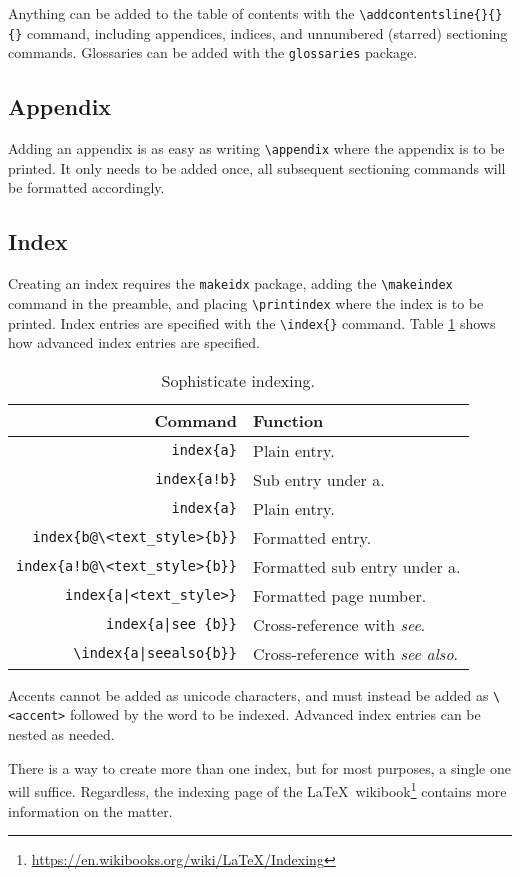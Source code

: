 Anything can be added to the table of contents with the
\verb|\addcontentsline{}{}{}| command, including appendices, indices,
and unnumbered (starred) sectioning commands.  Glossaries can be added
with the \verb|glossaries| package.
%
\subsection{Appendix}
%
Adding an appendix is as easy as writing \verb|\appendix| where the
appendix is to be printed.  It only needs to be added once, all
subsequent sectioning commands will be formatted accordingly.
%
\subsection{Index}
%
Creating an index requires the \verb|makeidx| package, adding the
\verb|\makeindex| command in the preamble, and placing
\verb|\printindex| where the index is to be printed.  Index entries
are specified with the \verb|\index{}| command.  Table \ref{t:index}
shows how advanced index entries are specified.
\begin{table}[!htbp]
  \centering
  \caption{Sophisticate indexing.}
  \label{t:index}
  \begin{tabular}{rl}
    \toprule
    Command & Function \\
    \midrule
    \verb|index{a}| & Plain entry. \\
    \verb|index{a!b}| & Sub entry under a. \\
    \verb|index{a}| & Plain entry. \\
    \verb|index{b@\<text_style>{b}}| & Formatted entry. \\
    \verb|index{a!b@\<text_style>{b}}| & Formatted sub entry under a. \\
    \verb+index{a|<text_style>}+ & Formatted page number. \\
    \verb+index{a|see {b}}+ & Cross-reference with \emph{see}. \\
    \verb+\index{a|seealso{b}}+ & Cross-reference with \emph{see also}.\\
    \bottomrule
  \end{tabular}
\end{table}
Accents cannot be added as unicode characters, and must instead be
added as \verb|\<accent>| followed by the word to be indexed.
Advanced index entries can be nested as needed.

There is a way to create more than one index, but for most purposes, a
single one will suffice.  Regardless, the indexing page of the
\LaTeX~wikibook\footnote{\url{https://en.wikibooks.org/wiki/LaTeX/Indexing}}
contains more information on the matter.
%
